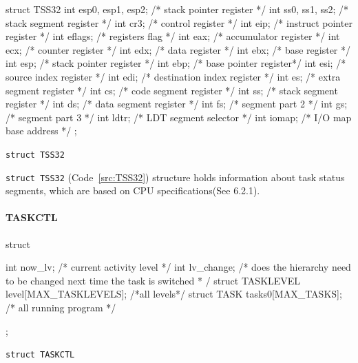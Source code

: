 \documentclass{swfcthesis}
\begin{document}
\begin{listing}[H]
  \begin{codeblock}
\begin{ccode}
struct TSS32
{ 
  int esp0, esp1, esp2; /* stack pointer register */
  int ss0, ss1, ss2;    /* stack segment register */
  int cr3;              /* control register */
  int eip;              /* instruct pointer register */
  int eflags;           /* registers flag */
  int eax;              /* accumulator register */
  int ecx;              /* counter register */
  int edx;              /* data register */
  int ebx;              /* base register */
  int esp;              /* stack pointer register */
  int ebp;              /* base pointer register*/
  int esi;              /* source index register */
  int edi;              /* destination index register */
  int es;               /* extra segment register */
  int cs;               /* code segment register */
  int ss;               /* stack segment register */
  int ds;               /* data segment register */
  int fs;               /* segment part 2 */
  int gs;               /* segment part 3 */
  int ldtr;             /* LDT segment selector */
  int iomap;            /* I/O map base address */
};
\end{ccode}
  \end{codeblock}
  \caption{\texttt{struct TSS32}}\label{src:TSS32}
\end{listing}

\texttt{struct TSS32} (Code~\ref{src:TSS32}) structure holds information about task status
segments, which are based on CPU specifications(See 6.2.1\cite{intel_3a}).


\paragraph{TASKCTL}

\begin{listing}[H]
  \begin{codeblock}
\begin{ccode}
struct 
{ 
  int now_lv;                             /* current activity level */
  int lv_change;                          /* does the hierarchy need to be changed next time the task is switched
  *                                       /
  struct TASKLEVEL level[MAX_TASKLEVELS]; /*all levels*/
  struct TASK tasks0[MAX_TASKS];          /* all running program */
  
};
\end{ccode}
  \end{codeblock}
  \caption{\texttt{struct TASKCTL}}\label{src:TASKCTL}
\end{listing}
\end{document}
